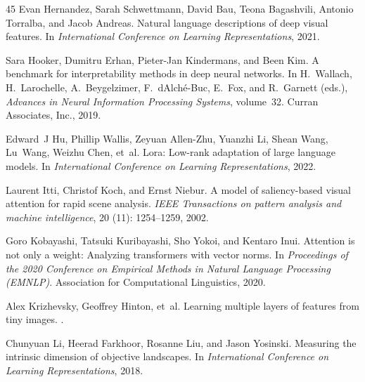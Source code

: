 \documentclass{article}
\begin{document}
\begin{thebibliography}{45}
Evan Hernandez, Sarah Schwettmann, David Bau, Teona Bagashvili, Antonio Torralba, and Jacob Andreas.
\newblock Natural language descriptions of deep visual features.
\newblock In \emph{International Conference on Learning Representations}, 2021.

Sara Hooker, Dumitru Erhan, Pieter-Jan Kindermans, and Been Kim.
\newblock A benchmark for interpretability methods in deep neural networks.
\newblock In H.~Wallach, H.~Larochelle, A.~Beygelzimer, F.~d\textquotesingle Alch\'{e}-Buc, E.~Fox, and R.~Garnett (eds.), \emph{Advances in Neural Information Processing Systems}, volume~32. Curran Associates, Inc., 2019.

Edward~J Hu, Phillip Wallis, Zeyuan Allen-Zhu, Yuanzhi Li, Shean Wang, Lu~Wang, Weizhu Chen, et~al.
\newblock Lora: Low-rank adaptation of large language models.
\newblock In \emph{International Conference on Learning Representations}, 2022.

Laurent Itti, Christof Koch, and Ernst Niebur.
\newblock A model of saliency-based visual attention for rapid scene analysis.
\newblock \emph{IEEE Transactions on pattern analysis and machine intelligence}, 20 (11): 1254--1259, 2002.

Goro Kobayashi, Tatsuki Kuribayashi, Sho Yokoi, and Kentaro Inui.
\newblock Attention is not only a weight: Analyzing transformers with vector norms.
\newblock In \emph{Proceedings of the 2020 Conference on Empirical Methods in Natural Language Processing (EMNLP)}. Association for Computational Linguistics, 2020.

Alex Krizhevsky, Geoffrey Hinton, et~al.
\newblock Learning multiple layers of features from tiny images.
.

Chunyuan Li, Heerad Farkhoor, Rosanne Liu, and Jason Yosinski.
\newblock Measuring the intrinsic dimension of objective landscapes.
\newblock In \emph{International Conference on Learning Representations}, 2018.


\end{thebibliography}
\end{document}

